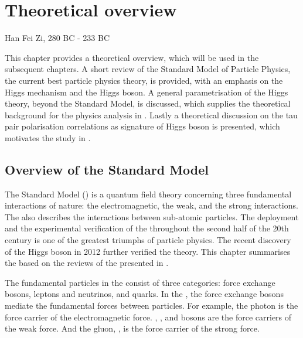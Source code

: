 \chapter{Theoretical overview}
\label{chap:Theory}

%
{Han Fei Zi, 280 BC - 233 BC}%

This chapter provides a theoretical overview, which will be used in the subsequent  chapters. A short review of the Standard Model of Particle Physics, the current best particle physics theory, is provided, with an emphasis on the Higgs mechanism and the Higgs boson. A general parametrisation of the Higgs theory, beyond the Standard Model, is discussed, which supplies the theoretical background for the physics analysis in . Lastly a theoretical discussion on the tau pair polarisation correlations as signature of Higgs boson is presented, which motivates the study in .

\section{Overview of the Standard Model}

The Standard Model (\SM) is a quantum field theory concerning three fundamental interactions of nature: the electromagnetic, the weak, and the strong interactions. The \SM also describes the interactions between sub-atomic particles. The deployment and the experimental verification of the \SM throughout the second half of the 20th century is one of the greatest triumphs of particle physics. The recent discovery of the Higgs boson in 2012 \cite{Aad:2012tfa,Chatrchyan:2012ufa} further verified the theory. This chapter summarises the \SM based on the reviews of the \SM presented in \cite{Agashe:2014kda,Thomson:2013zua,Tong:QFT,Gripaios:GFT}.

The fundamental particles in the \SM consist of three categories: force exchange bosons, leptons and neutrinos, and quarks. In the \SM, the force exchange bosons mediate the fundamental forces between particles. For example, the photon is the force carrier of the electromagnetic force. \PWp, \PWm, and \PZ  bosons are the force carriers of the weak force. And the gluon, \Pg, is the force carrier of the strong force.


